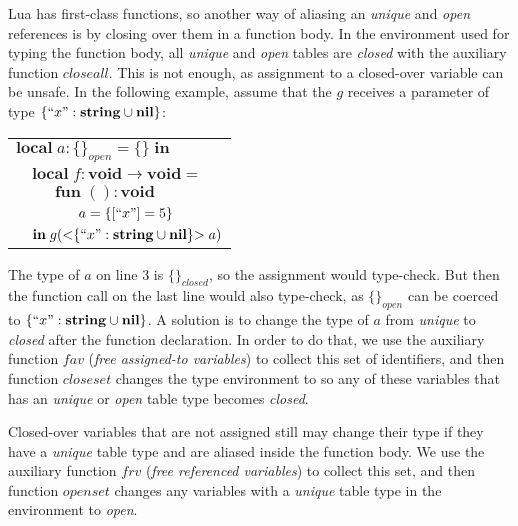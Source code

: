 \documentclass{sigplanconf}
\newcommand{\Nil}{\mathbf{nil}}
\newcommand{\String}{\mathbf{string}}
\newcommand{\Void}{\mathbf{void}}
\begin{document}
Lua has first-class functions, so another way of aliasing
an {\em unique} and {\em open} references is by closing
over them in a function body. In the environment used for
typing the function body, all {\em unique} and {\em open}
tables are {\em closed} with the auxiliary function $closeall$.
This is not enough, as assignment
to a closed-over variable can be unsafe. In the following
example, assume that the $g$ receives a parameter of type
$\{ ``x": \String \cup \Nil\}$:
\begin{center}
	\begin{tabular}{llll}
		\multicolumn{4}{l}{$\mathbf{local} \; a:\{\}_{open}
			= \{\} \; \mathbf{in}$}\\
		& \multicolumn{3}{l}{$\mathbf{local} \; f:\Void \rightarrow \Void =$}\\
		& & \multicolumn{2}{l}{$\mathbf{fun} \; ():\Void$}\\
		& & & \multicolumn{1}{l}{$a = \{[``x"]=5\} $}\\
		& \multicolumn{3}{l}{$\mathbf{in} \; g({<}\{``x":
			 \String \cup \Nil\}{>} \; a)$}
	\end{tabular}
\end{center}

The type of $a$ on line 3 is $\{\}_{closed}$, so the assignment
would type-check. But then the function call on the last line
would also type-check, as $\{\}_{open}$ can be coerced to
$\{ ``x": \String \cup \Nil\}$. A solution is to change the
type of $a$ from {\em unique} to {\em closed} after the function
declaration. In order to do that, we use the auxiliary function
$fav$ ({\em free assigned-to variables}) to collect this
set of identifiers, and then function $closeset$ changes
the type environment to so any of these variables that
has an {\em unique} or {\em open} table type becomes {\em closed}.

Closed-over variables that are not assigned still may
change their type if they have a {\em unique} table type
and are aliased inside the function body. We use the auxiliary
function $frv$ ({\em free referenced variables}) to collect
this set, and then function $openset$ changes any variables
with a {\em unique} table type in the environment to {\em open}.
\end{document}
